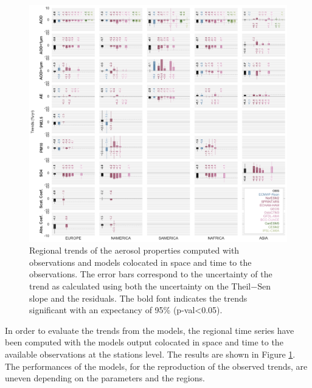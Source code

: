 \documentclass[journal abbreviation, manuscript]{copernicus}
\begin{document}
\begin{figure}[t]
 \includegraphics[width=16cm]{../scripts/figs/heatmaps/BARS.png}
 \caption{Regional trends of the aerosol properties computed with observations and models colocated in space and time to the observations. The error bars correspond to the uncertainty of the trend as calculated using both the uncertainty on the Theil−Sen slope and the residuals. The bold font indicates the trends significant with an expectancy of 95\% (p-val<0.05).}
 \label{fig:bars}
\end{figure}

In order to evaluate the trends from the models, the regional time series have been computed with the models output colocated in space and time to the available observations at the stations level. The results are shown in Figure \ref{fig:bars}. The performances of the models, for the reproduction of the observed trends, are uneven depending on the parameters and the regions.
\end{document}
